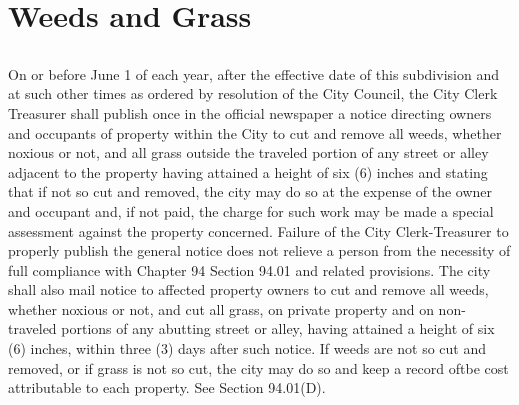 \setcounter{section}{34}
\section{Weeds and Grass}
\subsection{}
On or before June 1 of each year, after the effective date of this subdivision and at such other times as ordered by resolution of the City Council, the City Clerk Treasurer shall publish once in the official newspaper a notice directing owners and occupants of property within the City to cut and remove all weeds, whether noxious or not, and all grass outside the traveled portion of any street or alley adjacent to the property having attained a height of six (6) inches and stating that if not so cut and removed, the city may do so at the expense of the owner and occupant and, if not paid, the charge for such work may be made a special assessment against the property concerned. Failure of the City Clerk-Treasurer to properly publish the general notice does not relieve a person from the necessity of full compliance with Chapter 94 Section 94.01 and related provisions. The city shall also mail notice to affected property owners to cut and remove all weeds, whether noxious or not, and cut all grass, on private property and on non-traveled portions of any abutting street or alley, having attained a height of six (6) inches, within three (3) days after such notice. If weeds are not so cut and removed, or if grass is not so cut, the city may do so and keep a record oftbe cost attributable to each property. See Section 94.01(D).
